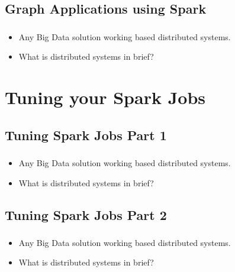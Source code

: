 \subsection{Graph Applications using Spark}

\begin{frame}
  \frametitle{\subsecname}
	\begin{itemize}[<+->]
		\item Any Big Data solution working based distributed systems.
		\item What is distributed systems in brief?
	\end{itemize}
\end{frame}



\section{Tuning your Spark Jobs}

\subsection{Tuning Spark Jobs Part 1}

\begin{frame}
  \frametitle{\subsecname}
	\begin{itemize}[<+->]
		\item Any Big Data solution working based distributed systems.
		\item What is distributed systems in brief?
	\end{itemize}
\end{frame}

\subsection{Tuning Spark Jobs Part 2}

\begin{frame}
  \frametitle{\subsecname}
	\begin{itemize}[<+->]
		\item Any Big Data solution working based distributed systems.
		\item What is distributed systems in brief?
	\end{itemize}
\end{frame}

